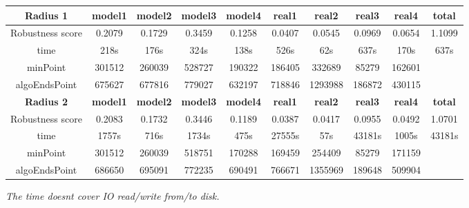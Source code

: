 \documentclass{article}
\begin{document}
\begin{table}[]
\begin{adjustwidth}{-1cm}{}
\begin{threeparttable}
\begin{tabular}{|c|c|c|c|c|c|c|c|c|c|}
			\textbf{Radius 1} & \textbf{model1} & \textbf{model2} & \textbf{model3} & \textbf{model4} & \textbf{real1} & \textbf{real2} & \textbf{real3} & \textbf{real4} & \textbf{total} \\ \hline
			Robustness score                            & 0.2079          & 0.1729          & 0.3459          & 0.1258          & 0.0407         & 0.0545         & 0.0969         & 0.0654         & 1.1099         \\ \hline
			time                             & 218s            & 176s            & 324s            & 138s            & 526s           & 62s            & 637s           & 170s           & 637s           \\ \hline
			minPoint                         & 301512          & 260039          & 528727          & 190322          & 186405         & 332689         & 85279          & 162601         &                \\ \hline
			algoEndsPoint                    & 675627          & 677816          & 779027          & 632197          & 718846         & 1293988        & 186872         & 430115         &                \\ \hline		
			
			\textbf{Radius 2} & \textbf{model1} & \textbf{model2} & \textbf{model3} & \textbf{model4} & \textbf{real1} & \textbf{real2} & \textbf{real3} & \textbf{real4} & \textbf{total} \\ \hline
			Robustness score                 & 0.2083          & 0.1732          & 0.3446          & 0.1189          & 0.0387         & 0.0417         & 0.0955         & 0.0492         & 1.0701         \\ \hline
			time                             & 1757s           & 716s            & 1734s           & 475s            & 27555s         & 57s            & 43181s         & 1005s          & 43181s         \\ \hline
			minPoint                         & 301512          & 260039          & 518751          & 170288          & 169459         & 254409         & 85279          & 171159         &                \\ \hline
			algoEndsPoint                    & 686650          & 695091          & 772235          & 690491          & 766671         & 1355969        & 189648         & 509904         &                \\ \hline
	
		\end{tabular}
		\begin{tablenotes}
			\small
			\item\textit{The time doesn\textquotesingle t cover IO read/write from/to disk.}
		\end{tablenotes}			
		\end{threeparttable}
		\end{adjustwidth}	
	\end{table}
	
\end{document}
